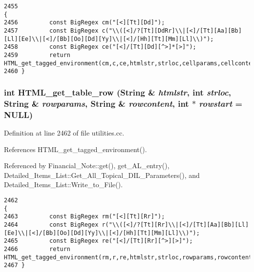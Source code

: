 \footnotesize\begin{verbatim}2455                                                                                                                          {
2456         const BigRegex cm("[<][Tt][Dd]");
2457         const BigRegex c("\\([<]/?[Tt][DdRr]\\|[<]/[Tt][Aa][Bb][Ll][Ee]\\|[<]/[Bb][Oo][Dd][Yy]\\|[<]/[Hh][Tt][Mm][Ll]\\)");
2458         const BigRegex ce("[<]/[Tt][Dd][^>]*[>]");
2459         return HTML_get_tagged_environment(cm,c,ce,htmlstr,strloc,cellparams,cellcontent,cellstart);
2460 }
\end{verbatim}\normalsize 
{}
\subsubsection{\setlength{\rightskip}{0pt plus 5cm}int HTML\_\-get\_\-table\_\-row ({\bf String} \& {\em htmlstr}, int {\em strloc}, {\bf String} \& {\em rowparams}, {\bf String} \& {\em rowcontent}, int $\ast$ {\em rowstart} = NULL)}\label{dil2al_8hh_a254}




Definition at line 2462 of file utilities.cc.

References HTML\_\-get\_\-tagged\_\-environment().

Referenced by Financial\_\-Note::get(), get\_\-AL\_\-entry(), Detailed\_\-Items\_\-List::Get\_\-All\_\-Topical\_\-DIL\_\-Parameters(), and Detailed\_\-Items\_\-List::Write\_\-to\_\-File().



\footnotesize\begin{verbatim}2462                                                                                                                      {
2463         const BigRegex rm("[<][Tt][Rr]");
2464         const BigRegex r("\\([<]/?[Tt][Rr]\\|[<]/[Tt][Aa][Bb][Ll][Ee]\\|[<]/[Bb][Oo][Dd][Yy]\\|[<]/[Hh][Tt][Mm][Ll]\\)");
2465         const BigRegex re("[<]/[Tt][Rr][^>][>]");
2466         return HTML_get_tagged_environment(rm,r,re,htmlstr,strloc,rowparams,rowcontent,rowstart);
2467 }
\end{verbatim}\normalsize 
{}
